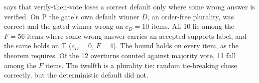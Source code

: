 \par\medskip\noindent
\begin{minipage}{\linewidth}
 says that verify-then-vote loses a correct default only where some wrong answer is verified. On P the gate's own default winner $D$, an order-free plurality, was correct and the gated winner wrong on $c_D = 10$ items. All 10 lie among the $F = 56$ items where some wrong answer carries an accepted supports label, and the same holds on T ($c_D = 0$, $F = 4$). The bound holds on every item, as the theorem requires. Of the 12 overturns counted against majority vote, 11 fall among the $F$ items. The twelfth is a plurality tie: random tie-breaking chose correctly, but the deterministic default did not.
\par
\end{minipage}
\par


